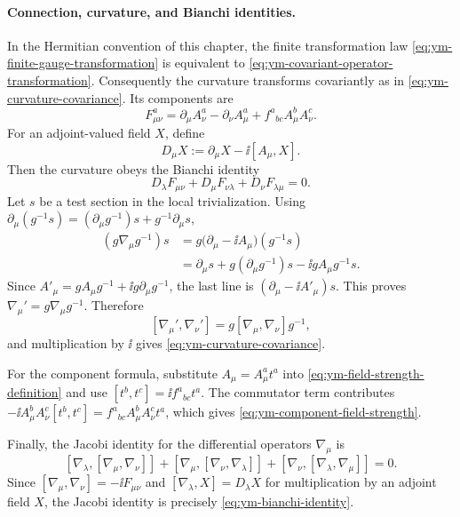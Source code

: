 \paragraph{Connection, curvature, and Bianchi identities.}
In the Hermitian convention of this chapter, the finite transformation law
\eqref{eq:ym-finite-gauge-transformation} is equivalent to
\eqref{eq:ym-covariant-operator-transformation}.  Consequently the curvature
transforms covariantly as in \eqref{eq:ym-curvature-covariance}.  Its
components are
\begin{equation}
  F^a_{\mu\nu}
  =
  \partial_\mu A^a_\nu-\partial_\nu A^a_\mu
  +f^a{}_{bc}A^b_\mu A^c_\nu .
  \label{eq:ym-component-field-strength}
\end{equation}
For an adjoint-valued field \(X\), define
\[
  D_\mu X:=\partial_\mu X-\ii[A_\mu,X].
\]
Then the curvature obeys the Bianchi identity
\begin{equation}
  D_\lambda F_{\mu\nu}
  +
  D_\mu F_{\nu\lambda}
  +
  D_\nu F_{\lambda\mu}
  =
  0 .
  \label{eq:ym-bianchi-identity}
\end{equation}
Let \(s\) be a test section in the local trivialization.  Using
\(\partial_\mu(g^{-1}s)=(\partial_\mu g^{-1})s+g^{-1}\partial_\mu s\),
\[
\begin{aligned}
  (g\nabla_\mu g^{-1})s
  &=
  g\bigl(\partial_\mu-\ii A_\mu\bigr)(g^{-1}s)  \\
  &=
  \partial_\mu s
  +g(\partial_\mu g^{-1})s
  -\ii gA_\mu g^{-1}s .
\end{aligned}
\]
Since \(A'_\mu=gA_\mu g^{-1}+\ii g\partial_\mu g^{-1}\), the last line is
\((\partial_\mu-\ii A'_\mu)s\).  This proves
\(\nabla_\mu'=g\nabla_\mu g^{-1}\).  Therefore
\[
  [\nabla_\mu',\nabla_\nu']
  =
  g[\nabla_\mu,\nabla_\nu]g^{-1},
\]
and multiplication by \(\ii\) gives
\eqref{eq:ym-curvature-covariance}.

For the component formula, substitute \(A_\mu=A^a_\mu t^a\) into
\eqref{eq:ym-field-strength-definition} and use
\([t^b,t^c]=\ii f^a{}_{bc}t^a\).  The commutator term contributes
\(-\ii A^b_\mu A^c_\nu[t^b,t^c]
=f^a{}_{bc}A^b_\mu A^c_\nu t^a\), which gives
\eqref{eq:ym-component-field-strength}.

Finally, the Jacobi identity for the differential operators \(\nabla_\mu\)
is
\[
  [\nabla_\lambda,[\nabla_\mu,\nabla_\nu]]
  +[\nabla_\mu,[\nabla_\nu,\nabla_\lambda]]
  +[\nabla_\nu,[\nabla_\lambda,\nabla_\mu]]
  =0 .
\]
Since \([\nabla_\mu,\nabla_\nu]=-\ii F_{\mu\nu}\) and
\([\nabla_\lambda,X]=D_\lambda X\) for multiplication by an adjoint field
\(X\), the Jacobi identity is precisely
\eqref{eq:ym-bianchi-identity}.

